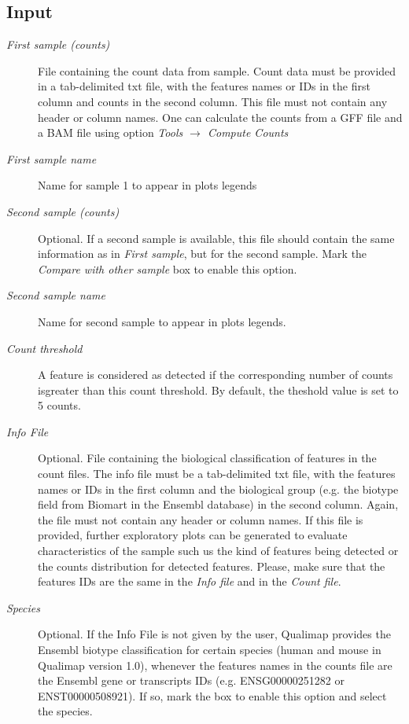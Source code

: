 \documentclass[a4paper,10pt,english]{sphinxmanual}
\begin{document}
\subsection{Input}
\label{analysis:id4}\begin{description}
\item[{\emph{First sample (counts)}}] \leavevmode
File containing the count data from sample. Count data must be provided in a tab-delimited txt file, with the features names or IDs in the first column and counts in the second column. This file must not contain any header or column names. One can calculate the counts from a GFF file and a BAM file using option \emph{Tools \(\rightarrow\) Compute Counts}

\item[{\emph{First sample name}}] \leavevmode
Name for sample 1 to appear in plots legends

\item[{\emph{Second sample (counts)}}] \leavevmode
Optional. If a second sample is available, this file should contain the same information as in \emph{First sample}, but for the second sample. Mark the \emph{Compare with other sample} box to enable this option.

\item[{\emph{Second sample name}}] \leavevmode
Name for second sample to appear in plots legends.

\item[{\emph{Count threshold}}] \leavevmode
A feature is considered as detected if the corresponding number of counts isgreater than this count threshold. By default, the theshold value is set to 5 counts.

\item[{\emph{Info File}}] \leavevmode
Optional. File containing the biological classification of features in the count files. The info file must be a tab-delimited txt file, with the features names or IDs in the first column and the biological group (e.g. the biotype field from Biomart in the Ensembl database) in the second column. Again, the file must not contain any header or column names. If this file is provided, further exploratory plots can be generated to evaluate characteristics of the sample such us the kind of features being detected or the counts distribution for detected features. Please, make sure that the features IDs are the same in the \emph{Info file} and in the \emph{Count file}.

\item[{\emph{Species}}] \leavevmode
Optional. If the Info File is not given by the user, Qualimap provides the Ensembl biotype classification for certain species (human and  mouse in Qualimap version 1.0), whenever the features names in the counts file are the Ensembl gene or transcripts IDs (e.g. ENSG00000251282 or ENST00000508921). If so, mark the box to enable this option and select the species.

\end{description}
\end{document}
